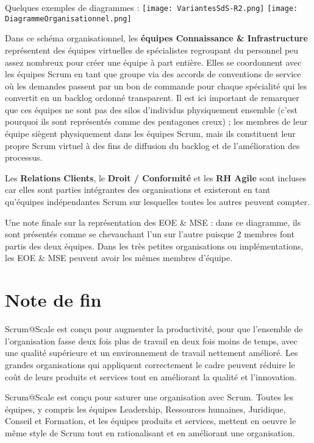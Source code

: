 \documentclass[12pt,a4paper,parskip=full]{scrartcl}
\begin{document}
Quelques exemples de diagrammes :
\texttt{[image: VariantesSdS-R2.png]}
\texttt{[image: DiagrammeOrganisationnel.png]}

Dans ce schéma organisationnel, les \textbf{équipes Connaissance \& Infrastructure}
représentent des équipes virtuelles de spécialistes regroupant du personnel peu assez
nombreux pour créer une équipe à part entière. Elles se coordonnent avec les équipes
Scrum en tant que groupe via des accords de conventions de service où les demandes
passent par un bon de commande pour chaque spécialité qui les convertit en un backlog
ordonné transparent. Il est ici important de remarquer que ces équipes ne sont pas des
silos d'individus physiquement ensemble (c'est pourquoi ils sont représentés comme des
pentagones creux) ; les membres de leur équipe siègent physiquement dans les équipes
Scrum, mais ils constituent leur propre Scrum virtuel à des fins de diffusion du backlog et
de l'amélioration des processus.

Les \textbf{Relations Clients}, le \textbf{Droit / Conformité} et les \textbf{RH Agile} sont incluses car elles sont
parties intégrantes des organisations et existeront en tant qu'équipes indépendantes
Scrum sur lesquelles toutes les autres peuvent compter.

Une note finale sur la représentation des EOE \& MSE : dans ce diagramme, ils sont
présentés comme se chevauchant l'un sur l'autre puisque 2 membres font partis des deux
équipes. Dans les très petites organisations ou implémentations, les EOE \& MSE peuvent
avoir les mêmes membres d'équipe.

\section{Note de fin}
Scrum@Scale est conçu pour augmenter la productivité, pour que l'ensemble de
l'organisation fasse deux fois plus de travail en deux fois moins de temps, avec une qualité
supérieure et un environnement de travail nettement amélioré. Les grandes organisations
qui appliquent correctement le cadre peuvent réduire le coût de leurs produits et services
tout en améliorant la qualité et l'innovation.

Scrum@Scale est conçu pour saturer une organisation avec Scrum. Toutes les équipes, y
compris les équipes Leadership, Ressources humaines, Juridique, Conseil et Formation,
et les équipes produits et services, mettent en oeuvre le même style de Scrum tout en
rationalisant et en améliorant une organisation.
\end{document}
